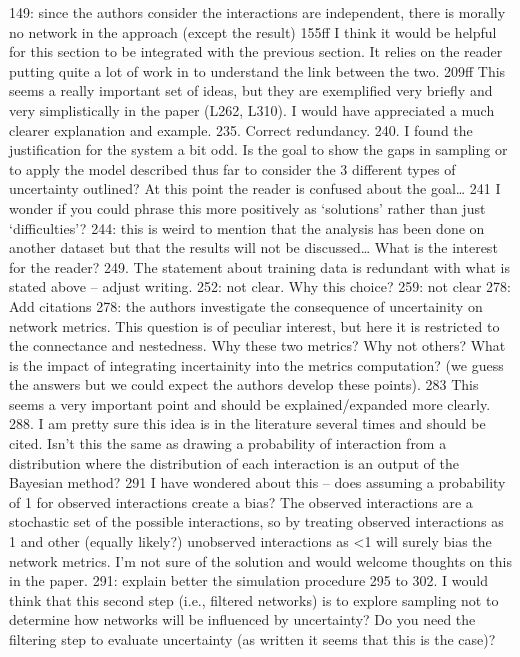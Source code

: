 149: since the authors consider the interactions are independent, there is morally no network in the approach (except the result)
155ff I think it would be helpful for this section to be integrated with the previous section. It relies on the reader putting quite a lot of work in to understand the link between the two.
209ff This seems a really important set of ideas, but they are exemplified very briefly and very simplistically in the paper (L262, L310). I would have appreciated a much clearer explanation and example.
235.  Correct redundancy.
240.  I found the justification for the system a bit odd.  Is the goal to show the gaps in sampling or to apply the model described thus far to consider the 3 different types of uncertainty outlined?  At this point the reader is confused about the goal…
241 I wonder if you could phrase this more positively as ‘solutions’ rather than just ‘difficulties’?
244: this is weird to mention that the analysis has been done on another dataset but that the results will not be discussed… What is the interest for the reader?
249.  The statement about training data is redundant with what is stated above – adjust writing.
252: not clear. Why this choice?
259: not clear
278: Add citations
278: the authors investigate the consequence of uncertainity on network metrics. This question is of peculiar interest, but here it is restricted to the connectance and nestedness. Why these two metrics? Why not others? What is the impact of integrating incertainity into the metrics computation? (we guess the answers but we could expect the authors develop these points).
283 This seems a very important point and should be explained/expanded more clearly.
288.  I am pretty sure this idea is in the literature several times and should be cited.  Isn’t this the same as drawing a probability of interaction from a distribution where the distribution of each interaction is an output of the Bayesian method?
291 I have wondered about this – does assuming a probability of 1 for observed interactions create a bias? The observed interactions are a stochastic set of the possible interactions, so by treating observed interactions as 1 and other (equally likely?) unobserved interactions as <1 will surely bias the network metrics. I’m not sure of the solution and would welcome thoughts on this in the paper.
291: explain better the simulation procedure
295 to 302.  I would think that this second step (i.e., filtered networks) is to explore sampling not to determine how networks will be influenced by uncertainty?  Do you need the filtering step to evaluate uncertainty (as written it seems that this is the case)?
